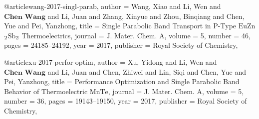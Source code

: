 @article{wang-2017-singl-parab,
  author =	 {Wang, Xiao and Li, Wen and $\textbf{Chen Wang}$ and Li, Juan and Zhang, Xinyue and Zhou, Binqiang and Chen, Yue
                  and Pei, Yanzhong},
  title =	 {Single Parabolic Band Transport in $\mathrm{P}$-Type $\mathrm{EuZn}$$\textsubscript{2}$$\mathrm{Sb}$$\textsubscript{2}$ Thermoelectrics},
  journal =	 {J. Mater. Chem. A},
  volume =	 5,
  number =	 46,
  pages =	 {24185--24192},
  year =	 2017,
  publisher =	 {Royal Society of Chemistry},
}

@article{xu-2017-perfor-optim,
  author =	 {Xu, Yidong and Li, Wen and $\textbf{Chen Wang}$ and Li, Juan and Chen, Zhiwei and Lin, Siqi and Chen, Yue and
                  Pei, Yanzhong},
  title =	 {Performance Optimization and Single Parabolic Band Behavior of Thermoelectric $\mathrm{MnTe}$},
  journal =	 {J. Mater. Chem. A},
  volume =	 5,
  number =	 36,
  pages =	 {19143--19150},
  year =	 2017,
  publisher =	 {Royal Society of Chemistry},
}


